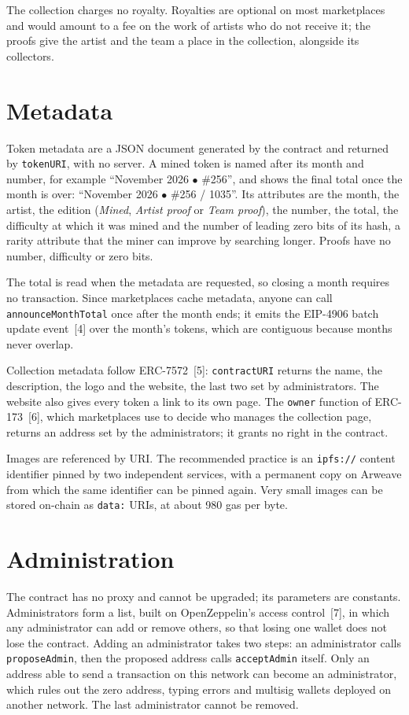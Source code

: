 \documentclass[10pt,letterpaper]{article}
\newcommand{\fn}[1]{\texttt{#1}}
\begin{document}
The collection charges no royalty. Royalties are optional on most marketplaces and would amount to a fee on the
work of artists who do not receive it; the proofs give the artist and the team a place in the collection, alongside
its collectors.

\section{Metadata}

Token metadata are a JSON document generated by the contract and returned by \fn{tokenURI}, with no server. A mined
token is named after its month and number, for example ``November 2026 $\bullet$ \#256'', and shows the final total
once the month is over: ``November 2026 $\bullet$ \#256 / 1035''. Its attributes are the month, the artist, the
edition (\emph{Mined}, \emph{Artist proof} or \emph{Team proof}), the number, the total, the difficulty at which it
was mined and the number of leading zero bits of its hash, a rarity attribute that the miner can improve by
searching longer. Proofs have no number, difficulty or zero bits.

The total is read when the metadata are requested, so closing a month requires no transaction. Since marketplaces
cache metadata, anyone can call \fn{announceMonthTotal} once after the month ends; it emits the EIP-4906 batch update
event~[4] over the month's tokens, which are contiguous because months never overlap.

Collection metadata follow ERC-7572~[5]: \fn{contractURI} returns the name, the description, the logo and the
website, the last two set by administrators. The website also gives every token a link to its own page. The
\fn{owner} function of ERC-173~[6], which marketplaces use to decide who manages the collection page, returns an
address set by the administrators; it grants no right in the contract.

Images are referenced by URI. The recommended practice is an \fn{ipfs://} content identifier pinned by two
independent services, with a permanent copy on Arweave from which the same identifier can be pinned again. Very
small images can be stored on-chain as \fn{data:} URIs, at about 980 gas per byte.

\section{Administration}

The contract has no proxy and cannot be upgraded; its parameters are constants. Administrators form a list, built on
OpenZeppelin's access control~[7], in which any administrator can add or remove others, so that losing one wallet does not lose the contract. Adding an
administrator takes two steps: an administrator calls \fn{proposeAdmin}, then the proposed address calls
\fn{acceptAdmin} itself. Only an address able to send a transaction on this network can become an administrator,
which rules out the zero address, typing errors and multisig wallets deployed on another network. The last
administrator cannot be removed.
\end{document}
